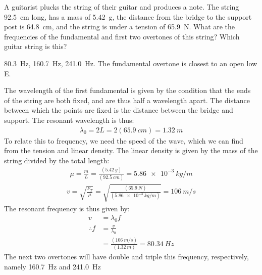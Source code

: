 \question A guitarist plucks the string of their guitar and produces a note. The string \SI{92.5}{cm} long, has a mass of \SI{5.42}{g}, the distance from the bridge to the support post is \SI{64.8}{cm}, and the string is under a tension of \SI{65.9}{N}. What are the frequencies of the fundamental and first two overtones of this string? Which guitar string is this?
\begin{finalanswer}
\SI{80.3}{Hz}, \SI{160.7}{Hz}, \SI{241.0}{Hz}. The fundamental overtone is closest to an open low E.
\end{finalanswer}
\begin{solution}
The wavelength of the first fundamental is given by the condition that the ends of the string are both fixed, and are thus half a wavelength apart. The distance between which the points are fixed is the distance between the bridge and support. The resonant wavelength is thus:
\begin{align*}
\lambda_0 = 2L=2(\SI{65.9}{cm})=\SI{1.32}{m}
\end{align*}
To relate this to frequency, we need the speed of the wave, which we can find from the tension and linear density. The linear density is given by the mass of the string divided by the total length:
\begin{align*}
\mu=\frac{m}{L}=\frac{(\SI{5.42}{g})}{(\SI{92.5}{cm})}=\SI{5.86e-3}{kg/m}
\end{align*}
\begin{align*}
v = \sqrt{\frac{F_T}{\mu}}=\sqrt{\frac{(\SI{65.9}{N})}{(\SI{5.86e-3}{kg/m})}}=\SI{106}{m/s}
\end{align*}
The resonant frequency is thus given by:
\begin{align*}
v &=\lambda_0 f \\
\therefore f&=\frac{v}{\lambda_0}\\
&=\frac{(\SI{106}{m/s})}{(\SI{1.32}{m})}=\SI{80.34}{Hz}
\end{align*}
The next two overtones will have double and triple this frequency, respectively, namely \SI{160.7}{Hz} and \SI{241.0}{Hz}
\end{solution}


